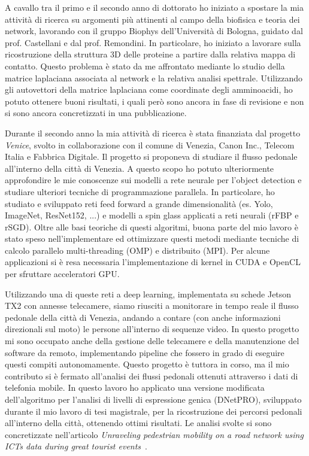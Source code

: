 \documentclass{standalone}
\begin{document}
A cavallo tra il primo e il secondo anno di dottorato ho iniziato a spostare la mia attività di ricerca su argomenti più attinenti al campo della biofisica e teoria dei network, lavorando con il gruppo Biophys dell'Università di Bologna, guidato dal prof. Castellani e dal prof. Remondini.
In particolare, ho iniziato a lavorare sulla ricostruzione della struttura 3D delle proteine a partire dalla relativa mappa di contatto.
Questo problema è stato da me affrontato mediante lo studio della matrice laplaciana associata al network e la relativa analisi spettrale.
Utilizzando gli autovettori della matrice laplaciana come coordinate degli amminoacidi, ho potuto ottenere buoni risultati, i quali però sono ancora in fase di revisione e non si sono ancora concretizzati in una pubblicazione.

Durante il secondo anno la mia attività di ricerca è stata finanziata dal progetto \emph{Venice}, svolto in collaborazione con il comune di Venezia, Canon Inc., Telecom Italia e Fabbrica Digitale.
Il progetto si proponeva di studiare il flusso pedonale all'interno della città di Venezia.
A questo scopo ho potuto ulteriormente approfondire le mie conoscenze sui modelli a rete neurale per l'object detection e studiare ulteriori tecniche di programmazione parallela.
In particolare, ho studiato e sviluppato reti feed forward a grande dimensionalità (es. Yolo, ImageNet, ResNet152, ...) e modelli a spin glass applicati a reti neurali (rFBP e rSGD).
Oltre alle basi teoriche di questi algoritmi, buona parte del mio lavoro è stato speso nell'implementare ed ottimizzare questi metodi mediante tecniche di calcolo parallelo multi-threading (OMP) e distribuito (MPI).
Per alcune applicazioni si è resa necessaria l'implementazione di kernel in CUDA e OpenCL per sfruttare acceleratori GPU.

Utilizzando una di queste reti a deep learning, implementata su schede Jetson TX2 con annesse telecamere, siamo riusciti a monitorare in tempo reale il flusso pedonale della città di Venezia, andando a contare (con anche informazioni direzionali sul moto) le persone all'interno di sequenze video.
In questo progetto mi sono occupato anche della gestione delle telecamere e della manutenzione del software da remoto, implementando pipeline che fossero in grado di eseguire questi compiti autonomamente.
Questo progetto è tuttora in corso, ma il mio contributo si è fermato all'analisi dei flussi pedonali ottenuti attraverso i dati di telefonia mobile.
In questo lavoro ho applicato una versione modificata dell'algoritmo per l'analisi di livelli di espressione genica (DNetPRO), sviluppato durante il mio lavoro di tesi magistrale, per la ricostruzione dei percorsi pedonali all'interno della città, ottenendo ottimi risultati.
Le analisi svolte si sono concretizzate nell'articolo \emph{Unraveling pedestrian mobility on a road network using ICTs data during great tourist events}~\cite{Mizzi2018}.
\end{document}
